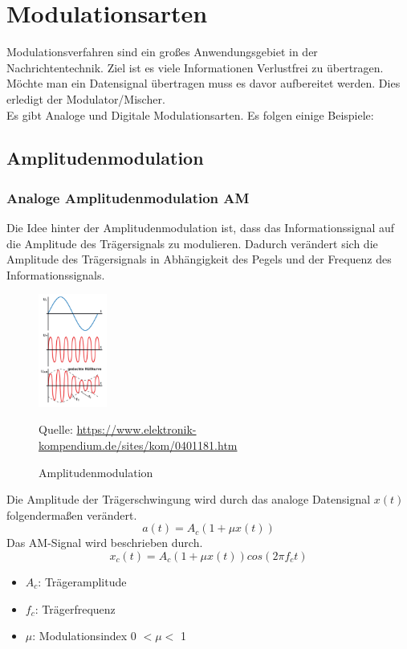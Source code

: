 \section{Modulationsarten}
Modulationsverfahren sind ein großes Anwendungsgebiet in der Nachrichtentechnik.
Ziel ist es viele Informationen Verlustfrei zu übertragen.
Möchte man ein Datensignal übertragen muss es davor
aufbereitet werden. Dies erledigt der Modulator/Mischer.
\\
Es gibt Analoge und Digitale Modulationsarten.
Es folgen einige Beispiele:


\subsection{Amplitudenmodulation}
\subsubsection{Analoge Amplitudenmodulation AM}
Die Idee hinter der Amplitudenmodulation ist, dass das Informationssignal
auf die Amplitude des Trägersignals zu modulieren.
Dadurch verändert sich die Amplitude des Trägersignals in Abhängigkeit des Pegels und
der Frequenz des Informationssignals.
\begin{figure}[H]
    \centering
    \includegraphics[width=0.20\textwidth]{Pictures/Screenshot 2025-06-19 125508.png}
    \caption{Amplitudenmodulation}
    \footnotesize{Quelle: \url{https://www.elektronik-kompendium.de/sites/kom/0401181.htm}}
    \label{fig:link_budget}
\end{figure}
Die Amplitude der Trägerschwingung wird durch das analoge Datensignal
$x(t)$ folgendermaßen verändert.
\begin{equation}
    a(t)=A_c(1+\mu x(t))
\end{equation}
Das AM-Signal wird beschrieben durch.
\begin{equation}
    x_c(t)=A_c(1+\mu x(t))cos(2\pi f_c t)
\end{equation}
\begin{itemize}
    \item $A_c$: Trägeramplitude
    \item $f_c$: Trägerfrequenz
    \item $\mu$: Modulationsindex 0 $< \mu <$ 1
\end{itemize}
